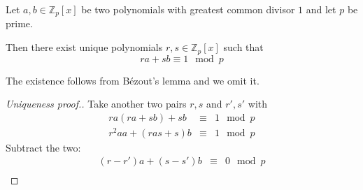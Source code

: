 \begin{frame}
\begin{lemma}
Let $a,b\in \mathbb  Z_p[x]$ be two polynomials with greatest common divisor $1$ and let $p$ be prime.

Then there exist unique polynomials $r,s\in \mathbb Z_p[x]$ such that 
\[
ra+sb\equiv 1 \mod p
\]


\end{lemma}
The existence follows from B\'ezout's lemma and we omit it.
\begin{proof}[Uniqueness proof.]

Take another two pairs $r,s$ and $r', s'$ with 
\[
\begin{array}{rcl}
ra(ra+sb)+sb&\equiv& 1 \mod p\\
r^2 a a+(ras+s)b&\equiv& 1\mod p
\end{array}
\]
Subtract the two:
\[
\begin{array}{rcl}
(r-r')a+(s-s')b &\equiv& 0 \mod p\\
\end{array}
\]


\end{proof}
\end{frame}